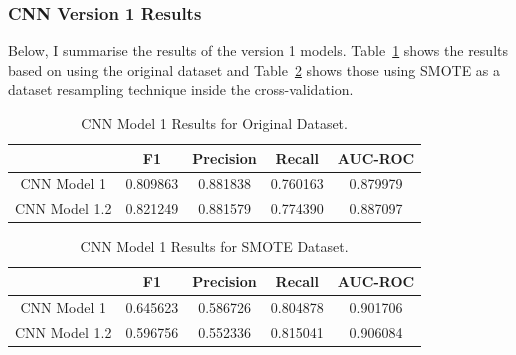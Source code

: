 \documentclass[12pt,a4paper,twoside]{report}
\begin{document}
\subsubsection{CNN Version 1 Results}

Below, I summarise the results of the version 1 models. Table~\ref{table:cnnv1-results-original} shows the results based on using the original dataset and Table~\ref{table:cnnv1-results-smote} shows those using SMOTE as a dataset resampling technique inside the cross-validation.

\begin{table}[H]  
  \centering
  \begin{tabular}{ccccc}
    \toprule
           		& F1 & Precision & Recall & AUC-ROC \\ \midrule
    CNN Model 1 & 0.809863 & 0.881838 & 0.760163 & 0.879979  \\
    CNN Model 1.2 & 0.821249 & 0.881579 & 0.774390 & 0.887097  \\
   \bottomrule
 \end{tabular}
 \caption{CNN Model 1 Results for Original Dataset.}
\label{table:cnnv1-results-original}
\end{table}

%

\begin{table}[H]  
  \centering
  \begin{tabular}{ccccc}
    \toprule
           		& F1 & Precision & Recall & AUC-ROC\\ \midrule
    CNN Model 1 & 0.645623 &  0.586726 & 0.804878 & 0.901706 \\
    CNN Model 1.2 &  0.596756  & 0.552336 & 0.815041 & 0.906084\\
   \bottomrule
 \end{tabular}
 \caption{CNN Model 1 Results for SMOTE Dataset.}
\label{table:cnnv1-results-smote}
\end{table}
\end{document}
